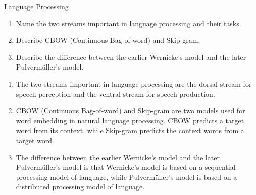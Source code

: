 \documentclass{article}
\begin{document}
\begin{exercise}{Language Processing}
  \begin{enumerate}
    \item Name the two streams important in language processing and their tasks.
    \item Describe CBOW (Continuous Bag-of-word) and Skip-gram.
    \item Describe the difference between the earlier Wernicke's model and the later Pulvermüller's model.
  \end{enumerate}

  \begin{solution}
    \begin{enumerate}
      \item The two streams important in language processing are the dorsal stream for speech perception and the ventral stream for speech production.
      \item CBOW (Continuous Bag-of-word) and Skip-gram are two models used for word embedding in natural language processing. CBOW predicts a target word from its context, while Skip-gram predicts the context words from a target word.
      \item The difference between the earlier Wernicke's model and the later Pulvermüller's model is that Wernicke's model is based on a sequential processing model of language, while Pulvermüller's model is based on a distributed processing model of language.
    \end{enumerate}
  \end{solution}
\end{exercise}
\end{document}
